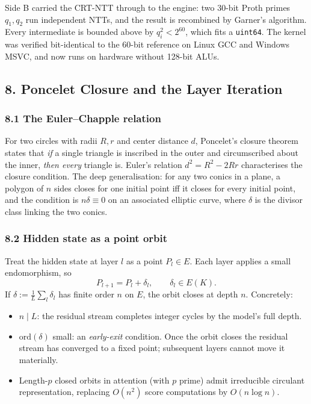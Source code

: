 \documentclass[
  11pt,
]{article}
\providecommand{\tightlist}{%
  \setlength{\itemsep}{0pt}\setlength{\parskip}{0pt}}
\begin{document}
Side B carried the CRT-NTT through to the engine: two 30-bit Proth
primes \(q_1, q_2\) run independent NTTs, and the result is recombined
by Garner's algorithm. Every intermediate is bounded above by
\(q_i^2 < 2^{60}\), which fits a \texttt{uint64}. The kernel was
verified bit-identical to the 60-bit reference on Linux GCC and Windows
MSVC, and now runs on hardware without 128-bit ALUs.

\hypertarget{poncelet-closure-and-the-layer-iteration}{%
\subsection{8. Poncelet Closure and the Layer
Iteration}\label{poncelet-closure-and-the-layer-iteration}}

\hypertarget{the-eulerchapple-relation}{%
\subsubsection{8.1 The Euler--Chapple
relation}\label{the-eulerchapple-relation}}

For two circles with radii \(R, r\) and center distance \(d\),
Poncelet's closure theorem states that \emph{if} a single triangle is
inscribed in the outer and circumscribed about the inner, \emph{then
every} triangle is. Euler's relation \(d^2 = R^2 - 2Rr\) characterises
the closure condition. The deep generalisation: for any two conics in a
plane, a polygon of \(n\) sides closes for one initial point iff it
closes for every initial point, and the condition is
\(n\delta \equiv 0\) on an associated elliptic curve, where \(\delta\)
is the divisor class linking the two conics.

\hypertarget{hidden-state-as-a-point-orbit}{%
\subsubsection{8.2 Hidden state as a point
orbit}\label{hidden-state-as-a-point-orbit}}

Treat the hidden state at layer \(l\) as a point \(P_l \in E\). Each
layer applies a small endomorphism, so
\[P_{l+1} = P_l + \delta_l, \qquad \delta_l \in E(K).\] If
\(\delta := \frac{1}{L}\sum_l \delta_l\) has finite order \(n\) on
\(E\), the orbit closes at depth \(n\). Concretely:

\begin{itemize}
\tightlist
\item
  \(n \mid L\): the residual stream completes integer cycles by the
  model's full depth.
\item
  \(\mathrm{ord}(\delta)\) small: an \emph{early-exit} condition. Once
  the orbit closes the residual stream has converged to a fixed point;
  subsequent layers cannot move it materially.
\item
  Length-\(p\) closed orbits in attention (with \(p\) prime) admit
  irreducible circulant representation, replacing \(O(n^2)\) score
  computations by \(O(n\log n)\).
\end{itemize}
\end{document}
